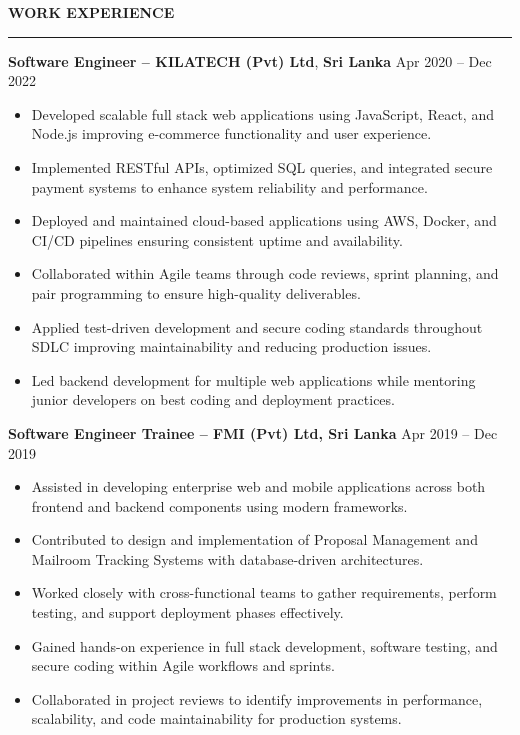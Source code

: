 \documentclass[10pt,letterpaper]{article}
\begin{document}
\vspace{8pt}

\textbf{WORK EXPERIENCE}\\[-8pt]
\noindent\rule{\textwidth}{1pt}

\vspace{-2pt}

\textbf{Software Engineer -- KILATECH (Pvt) Ltd}, \textbf{Sri Lanka} \hfill Apr 2020 -- Dec 2022

\vspace{-1pt}

\begin{itemize}
\item Developed scalable full stack web applications using JavaScript, React, and Node.js improving e-commerce functionality and user experience.
\item Implemented RESTful APIs, optimized SQL queries, and integrated secure payment systems to enhance system reliability and performance.
\item Deployed and maintained cloud-based applications using AWS, Docker, and CI/CD pipelines ensuring consistent uptime and availability.
\item Collaborated within Agile teams through code reviews, sprint planning, and pair programming to ensure high-quality deliverables.
\item Applied test-driven development and secure coding standards throughout SDLC improving maintainability and reducing production issues.
\item Led backend development for multiple web applications while mentoring junior developers on best coding and deployment practices.
\end{itemize}

\textbf{Software Engineer Trainee -- FMI (Pvt) Ltd, Sri Lanka} \hfill Apr 2019 -- Dec 2019

\vspace{-1pt}

\begin{itemize}
\item Assisted in developing enterprise web and mobile applications across both frontend and backend components using modern frameworks.
\item Contributed to design and implementation of Proposal Management and Mailroom Tracking Systems with database-driven architectures.
\item Worked closely with cross-functional teams to gather requirements, perform testing, and support deployment phases effectively.
\item Gained hands-on experience in full stack development, software testing, and secure coding within Agile workflows and sprints.
\item Collaborated in project reviews to identify improvements in performance, scalability, and code maintainability for production systems.
\end{itemize}
\end{document}
